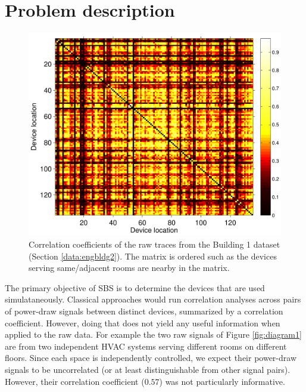 \section{Problem description}
\begin{figure}
\begin{center}
\includegraphics[width=.45\textwidth]{img/heatMap_raw_201106-eps-converted-to.pdf}
\caption{Correlation coefficients of the raw traces from the Building 1 dataset (Section \ref{data:engbldg2}).
The matrix is ordered such as the devices serving same/adjacent rooms are nearby in the matrix.}
\label{fig:heatmap:raw}
\end{center}
\end{figure}

The primary objective of SBS is to determine the devices that are used simulataneously.
Classical approaches would run correlation analyses across pairs of power-draw signals between distinct devices, summarized by a correlation coefficient.  
However, doing that does not yield any useful information when applied to the raw data.
For example the two raw signals of Figure \ref{fig:diagram1} are from two independent HVAC systems serving different rooms on different floors.
Since each space is independently controlled, we expect their power-draw signals to be uncorrelated (or at least distinguishable 
from other signal pairs).  However, their correlation coefficient ($0.57$) was not particularly informative.  

